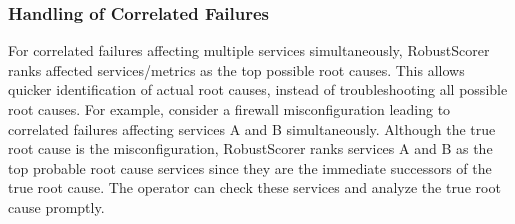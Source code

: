 \subsubsection{Handling of Correlated Failures}
For correlated failures affecting multiple services simultaneously, RobustScorer ranks affected services/metrics as the top possible root causes. This allows quicker identification of actual root causes, instead of troubleshooting all possible root causes. For example, consider a firewall misconfiguration leading to correlated failures affecting services A and B simultaneously. Although the true root cause is the misconfiguration, RobustScorer ranks services A and B as the top probable root cause services since they are the immediate successors of the true root cause. The operator can check these services and analyze the true root cause promptly.

